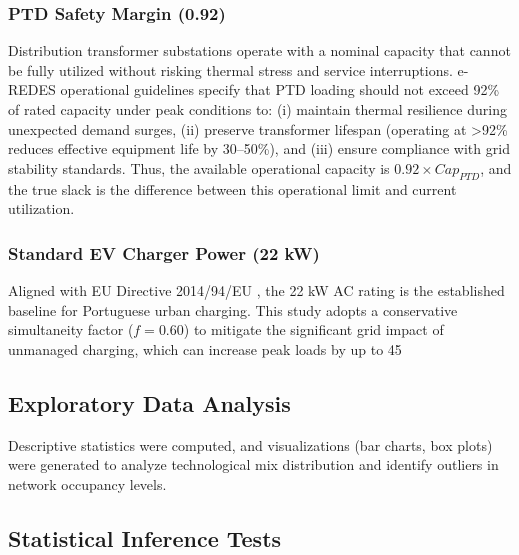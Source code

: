 \documentclass[conference]{IEEEtran}
\begin{document}
\subsubsection{PTD Safety Margin (0.92)}

Distribution transformer substations operate with a nominal capacity that cannot be fully utilized without risking thermal stress and service interruptions. e-REDES operational guidelines specify that PTD loading should not exceed 92\% of rated capacity under peak conditions to: (i) maintain thermal resilience during unexpected demand surges, (ii) preserve transformer lifespan (operating at >92\% reduces effective equipment life by 30--50\%), and (iii) ensure compliance with grid stability standards. Thus, the available operational capacity is $0.92 \times Cap_{PTD}$, and the true slack is the difference between this operational limit and current utilization.

\subsubsection{Standard EV Charger Power (22 kW)}

Aligned with EU Directive 2014/94/EU \cite{Grid2020}, the 22 kW AC rating is the established baseline for Portuguese urban charging. This study adopts a conservative simultaneity factor ($f = 0.60$) to mitigate the significant grid impact of unmanaged charging, which can increase peak loads by up to 45%

\subsection{Exploratory Data Analysis}

Descriptive statistics were computed, and visualizations (bar charts, box plots) were generated to analyze technological mix distribution and identify outliers in network occupancy levels.

\subsection{Statistical Inference Tests}
\end{document}
